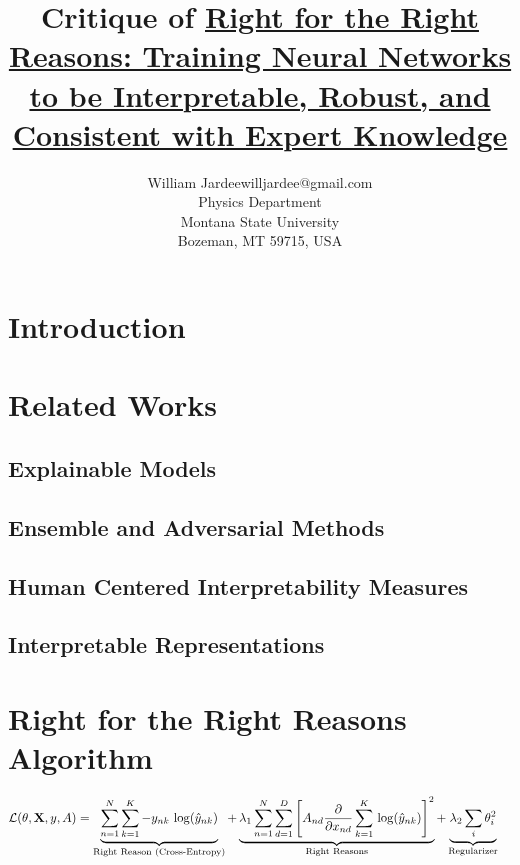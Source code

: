 \documentclass[twoside,11pt]{article}
\begin{document}
\title{Critique of \ul{Right for the Right Reasons: Training Neural Networks to be Interpretable, Robust, and Consistent with Expert Knowledge}}

\author{\name William Jardee\email willjardee@gmail.com \\
       \addr Physics Department\\
       Montana State University\\
       Bozeman, MT 59715, USA
       }
\editor{\,}

\maketitle
 
\section{Introduction}


\section{Related Works}
\subsection{Explainable Models}
\subsection{Ensemble and Adversarial Methods}
\subsection{Human Centered Interpretability Measures}
\subsection{Interpretable Representations}


\section{Right for the Right Reasons Algorithm}

\begin{align}
\mathcal{L}(\theta, \vb{X}, y, A) &  = \underbrace{\sum^N_{n=1}\sum^K_{k=1}-y_{nk}\,\log(\hat{y}_{nk})}_\text{Right Reason (Cross-Entropy)} + \underbrace{\lambda_1 \sum^N_{n=1}\sum^D_{d=1}\left[A_{nd}\pdv{x_{nd}}\sum^K_{k=1}\, \log(\hat{y}_{nk})\right]^2}_\text{Right Reasons} + \underbrace{\lambda_2 \sum_i \theta^2_i}_\text{Regularizer}
\label{fn:1}
\end{align}
\end{document}
